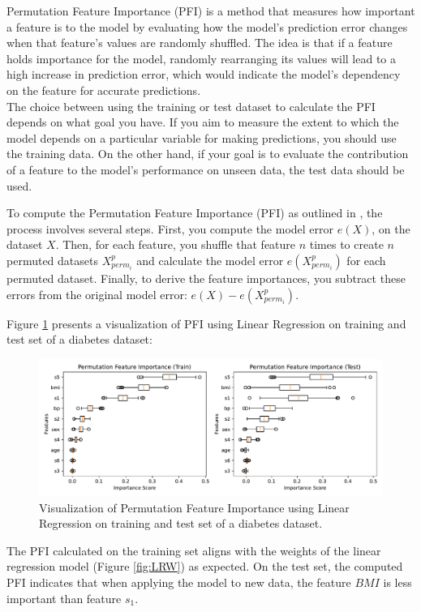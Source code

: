 Permutation Feature Importance (PFI) is a method that measures how important a feature is to the model by evaluating how the model's prediction error changes when that feature's values are randomly shuffled. The idea is that if a feature holds importance for the model, randomly rearranging its values will lead to a high increase in prediction error, which would indicate the model's dependency on the feature for accurate predictions.\\
The choice between using the training or test dataset to calculate the PFI depends on what goal you have. If you aim to measure the extent to which the model depends on a particular variable for making predictions, you should use the training data. On the other hand, if your goal is to evaluate the contribution of a feature to the model's performance on unseen data, the test data should be used. 

To compute the Permutation Feature Importance (PFI) as outlined in \cite{fisher2019all}, the process involves several steps. First, you compute the model error \( e(X) \), on the dataset \( X \). Then, for each feature, you shuffle that feature \( n \) times to create \( n \) permuted datasets \( X^p_{perm_i} \) and calculate the model error \( e(X^p_{perm_i}) \) for each permuted dataset. Finally, to derive the feature importances, you subtract these errors from the original model error: \( e(X) - e(X^p_{perm_i}) \).

Figure \ref{fig:pfi} presents a visualization of PFI using Linear Regression on training and test set of a diabetes dataset:

\begin{figure}[H]
    \centering
    \includegraphics[width=1\linewidth]{pics/Permutation_Feature_Importance.pdf}
    \caption{Visualization of Permutation Feature Importance using Linear Regression on training and test set of a diabetes dataset.}
    \label{fig:pfi}
\end{figure}

The PFI calculated on the training set aligns with the weights of the linear regression model (Figure \ref{fig:LRW}) as expected. On the test set, the computed PFI indicates that when applying the model to new data, the feature $BMI$ is less important than feature $s_1$.

